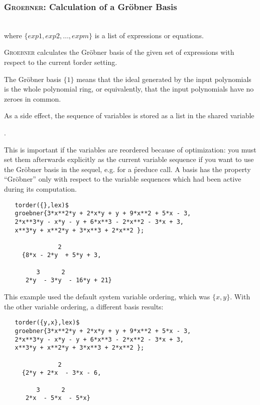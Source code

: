 \subsubsection{\textsc{Groebner}: Calculation of a Gr\"obner Basis}
\begin{description}
\item[\f{groebner} $\{exp1, exp2, \ldots , expm\};$]\mbox{}\\
  \hypertarget{operator:GROEBNER}{}
where $\{exp1, exp2, \ldots , expm\}$ is a list of
expressions or equations.

\textsc{Groebner} calculates the Gr\"obner basis of the given set of
expressions with respect to the current \f{torder} setting.

The Gr\"obner basis $\{1\}$ means that the ideal generated by the
input polynomials is the whole polynomial ring, or equivalently, that
the input polynomials have no zeroes in common.

As a side effect, the sequence of variables is stored as a \REDUCE list
in the shared variable
\hypertarget{reserved:GVARSLAST}{}
\begin{center}
.
\end{center}

This is important if the variables are reordered because of optimization:
you must set them afterwards explicitly as the current variable sequence
if you want to use the Gr\"obner basis in the sequel, e.g. for a
\f{preduce} call. A basis has the property ``Gr\"obner'' only with respect
to the variable sequences which had been active during its computation.
\end{description}

\example {}
\begin{verbatim}
   torder({},lex)$
   groebner{3*x**2*y + 2*x*y + y + 9*x**2 + 5*x - 3,
   2*x**3*y - x*y - y + 6*x**3 - 2*x**2 - 3*x + 3,
   x**3*y + x**2*y + 3*x**3 + 2*x**2 };

               2
     {8*x - 2*y  + 5*y + 3,

         3      2
      2*y  - 3*y  - 16*y + 21}
\end{verbatim}


This example used the default system variable ordering, which was
$\{x,y\}$. With the other variable ordering, a different basis results:

\begin{verbatim}
   torder({y,x},lex)$
   groebner{3*x**2*y + 2*x*y + y + 9*x**2 + 5*x - 3,
   2*x**3*y - x*y - y + 6*x**3 - 2*x**2 - 3*x + 3,
   x**3*y + x**2*y + 3*x**3 + 2*x**2 };

               2
     {2*y + 2*x  - 3*x - 6,

         3      2
      2*x  - 5*x  - 5*x}
\end{verbatim}



